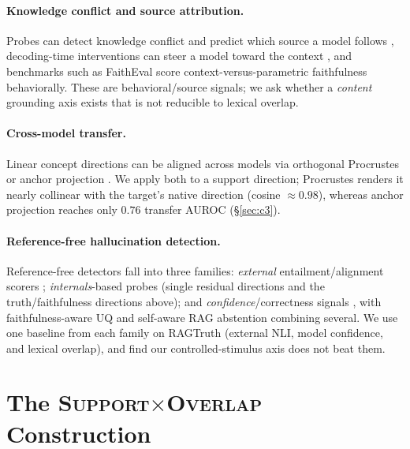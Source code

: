 \paragraph{Knowledge conflict and source attribution.}
Probes can detect knowledge conflict and predict which source a model follows
\citep{zhao2024residualconflict,sun2025redeep,brink2026attribution}, decoding-time
interventions can steer a model toward the context \citep{shi2024cad}, and benchmarks
such as FaithEval \citep{ming2025faitheval} score context-versus-parametric
faithfulness behaviorally. These are
behavioral/source signals; we ask whether a \emph{content} grounding axis exists
that is not reducible to lexical overlap.

\paragraph{Cross-model transfer.}
Linear concept directions can be aligned across models via orthogonal Procrustes
\citep{schonemann1966,puri2025atlas} or anchor projection \citep{kim2026crossfamily}. We apply both
to a support direction; Procrustes renders it nearly collinear with the target's
native direction (cosine ${\approx}0.98$), whereas anchor projection reaches only
$0.76$ transfer AUROC (\S\ref{sec:c3}).

\paragraph{Reference-free hallucination detection.}
Reference-free detectors fall into three families: \emph{external} entailment/alignment
scorers \citep{zha2023alignscore}; \emph{internals}-based probes (single residual
directions \citep{oneill2025singledirection} and the truth/faithfulness directions
above); and \emph{confidence}/correctness signals
\citep{cho2026confidencemanifold,noanswer2025}, with faithfulness-aware UQ
\citep{fadeeva2025franq} and self-aware RAG abstention \citep{zhu2026saber} combining
several. We use one baseline from each family on
RAGTruth (external NLI, model confidence, and lexical overlap), and find our
controlled-stimulus axis does not beat them.

\section{The \texorpdfstring{\textsc{Support}$\times$\textsc{Overlap}}{Support\texttimes Overlap} Construction}
\label{sec:construction}

